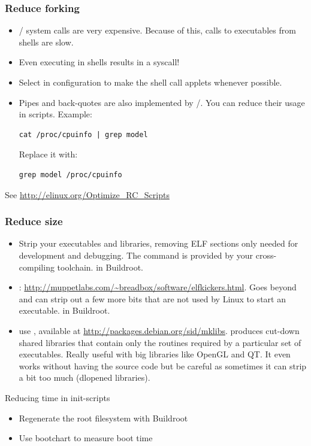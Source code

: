 \begin{frame}[fragile]
\frametitle{Reduce forking}
\begin{itemize}
	\item {}/ system calls are very expensive.
		Because of this, calls to executables from shells are slow.
	\item Even executing  in  shells results
	      in a  syscall!
	\item Select  in 
	      configuration to make the  shell call applets
	      whenever possible.
	\item Pipes and back-quotes are also implemented by
	      /.  You can reduce their usage in
	      scripts. Example:
	      \begin{block}{}
			\begin{verbatim}
cat /proc/cpuinfo | grep model
			\end{verbatim}
		\end{block}
		Replace it with:
		\begin{block}{}
			\begin{verbatim}
grep model /proc/cpuinfo
			\end{verbatim}
		\end{block}
\end{itemize}
See \url{http://elinux.org/Optimize_RC_Scripts}
\end{frame}

\begin{frame}
\frametitle{Reduce size}
\begin{itemize}
	\item Strip your executables and libraries, removing ELF sections
		only needed for development and debugging. The 
		command is provided by your cross-compiling toolchain.
		 in Buildroot.
	\item {}:
		\url{http://muppetlabs.com/~breadbox/software/elfkickers.html}.
		Goes beyond  and can strip out a few more bits
		that are not used by Linux to start an executable.
		 in Buildroot.
	\item use , available at
		\url{http://packages.debian.org/sid/mklibs}.
		 produces cut-down shared libraries that contain
		only the routines required by a particular set of executables.
		Really useful with big libraries like OpenGL and QT. It even
		works without having the source code but be careful as
		sometimes it can strip a bit too much (dlopened libraries).
\end{itemize}
\end{frame}

\setuplabframe
{Reducing time in init-scripts}
{
\begin{itemize}
\item Regenerate the root filesystem with Buildroot
\item Use bootchart to measure boot time
\end{itemize}
}


